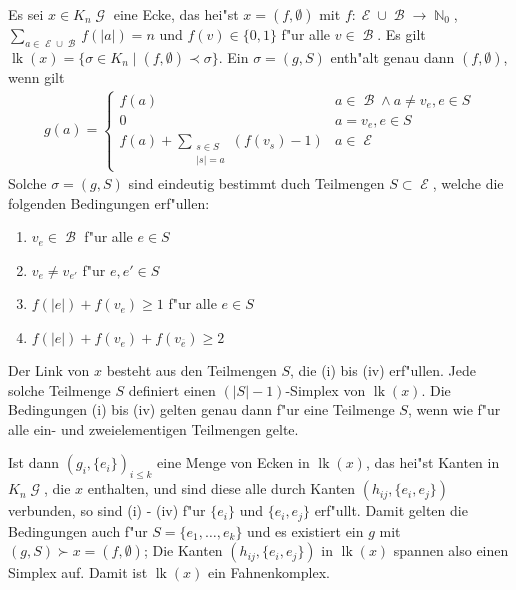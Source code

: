 \documentclass[paper=A4, twoside, chapterprefix=true, bibliography=totoc, headsepline]{scrbook}
\DeclareMathOperator{\N}{\mathbb{N}}
\DeclareMathOperator{\calB}{{\mathcal{B}}}
\DeclareMathOperator{\calE}{{\mathcal{E}}}
\DeclareMathOperator{\calG}{{\mathcal{G}}}
\newcommand{\E}{\calE}
\newcommand{\G}{\calG}
\DeclareMathOperator{\lk}{lk} %
\theoremstyle{nonumberbreak}
\theoremstyle{emptybreak}
\theoremstyle{break}
\begin{document}
Es sei $x \in K_n\G$ eine Ecke, das hei"st $x = (f, \emptyset)$ mit $f: \E \cup \calB \to \N_0$, $\sum_{a \in \E \cup \calB} f(|a|) = n$ und $f(v) \in \{0, 1\}$ f"ur alle $v \in \calB$.
Es gilt $\lk(x) = \{ \sigma \in K_n \mid (f, \emptyset) \prec \sigma \}$.
Ein $\sigma = (g, S)$ enth"alt genau dann $(f, \emptyset)$, wenn gilt
\begin{align*}
	g(a) = \begin{cases}
		f(a) & a \in \calB \wedge a \ne v_e, e \in S \\
		0 & a = v_e, e \in S \\
		f(a) + \sum_{\substack{s \in S \\ |s| = a}} (f(v_s) - 1) & a \in \E
	\end{cases}
\end{align*}
Solche $\sigma = (g, S)$ sind eindeutig bestimmt duch Teilmengen $S \subset \E$, welche die folgenden Bedingungen erf"ullen:
\begin{enumerate}[label=(\roman*)]
\item
	$v_e \in \calB$ f"ur alle $e \in S$
\item
	$v_e \ne v_{e'}$ f"ur $e, e' \in S$
\item
	$f(|e|) + f(v_e) \ge 1$ f"ur alle $e \in S$
\item
	$f(|e|) + f(v_e) + f(v_{\overline{e}}) \ge 2$
\end{enumerate}
Der Link von $x$ besteht aus den Teilmengen $S$, die (i) bis (iv) erf"ullen.
Jede solche Teilmenge $S$ definiert einen $(|S| - 1)$-Simplex von $\lk(x)$.
Die Bedingungen (i) bis (iv) gelten genau dann f"ur eine Teilmenge $S$, wenn wie f"ur alle ein- und zweielementigen Teilmengen gelte.

Ist dann $(g_i, \{e_i\})_{i \le k}$ eine Menge von Ecken in $\lk(x)$, das hei"st Kanten in $K_n\G$, die $x$ enthalten, und sind diese alle durch Kanten $(h_{ij}, \{e_i, e_j\})$ verbunden, so sind (i) - (iv) f"ur $\{e_i\}$ und $\{e_i, e_j\}$ erf"ullt.
Damit gelten die Bedingungen auch f"ur $S = \{e_1, \ldots, e_k\}$ und es existiert ein $g$ mit $(g, S) \succ x = (f, \emptyset)$; Die Kanten $(h_{ij}, \{e_i, e_j\})$ in $\lk(x)$ spannen also einen Simplex auf.
Damit ist $\lk(x)$ ein Fahnenkomplex.
\end{document}
